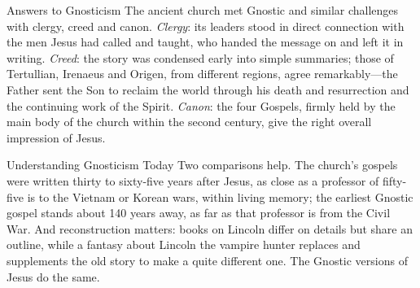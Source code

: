 \begin{sidebox}{Answers to Gnosticism}
The ancient church met Gnostic and similar challenges with clergy, creed and canon. \emph{Clergy}:
its leaders stood in direct connection with the men Jesus had called and taught, who handed the message on and left it in writing. \emph{Creed}: the story was condensed early into simple summaries;
those of Tertullian, Irenaeus and Origen, from different regions, agree remarkably---the Father sent
the Son to reclaim the world through his death and resurrection and the continuing work of the Spirit.
\emph{Canon}: the four Gospels, firmly held by the main body of the church within the second century,
give the right overall impression of Jesus.
\end{sidebox}

\begin{sidebox}{Understanding Gnosticism Today}
Two comparisons help. The church's gospels were written thirty to sixty-five years after Jesus, as
close as a professor of fifty-five is to the Vietnam or Korean wars, within living memory; the
earliest Gnostic gospel stands about 140 years away, as far as that professor is from the Civil War.
And reconstruction matters: books on Lincoln differ on details but share an outline, while a fantasy
about Lincoln the vampire hunter replaces and supplements the old story to make a quite different
one. The Gnostic versions of Jesus do the same.
\end{sidebox}

\begin{keyfacts}
\end{keyfacts}
